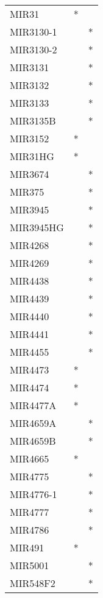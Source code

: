 \begin{longtable}{lcc}
MIR31          &         * &         \\
MIR3130-1      &           &       * \\
MIR3130-2      &           &       * \\
MIR3131        &           &       * \\
MIR3132        &           &       * \\
MIR3133        &           &       * \\
MIR3135B       &           &       * \\
MIR3152        &         * &         \\
MIR31HG        &         * &         \\
MIR3674        &           &       * \\
MIR375         &           &       * \\
MIR3945        &           &       * \\
MIR3945HG      &           &       * \\
MIR4268        &           &       * \\
MIR4269        &           &       * \\
MIR4438        &           &       * \\
MIR4439        &           &       * \\
MIR4440        &           &       * \\
MIR4441        &           &       * \\
MIR4455        &           &       * \\
MIR4473        &         * &         \\
MIR4474        &         * &         \\
MIR4477A       &         * &         \\
MIR4659A       &           &       * \\
MIR4659B       &           &       * \\
MIR4665        &         * &         \\
MIR4775        &           &       * \\
MIR4776-1      &           &       * \\
MIR4777        &           &       * \\
MIR4786        &           &       * \\
MIR491         &         * &         \\
MIR5001        &           &       * \\
MIR548F2       &           &       * \\

\end{longtable}
